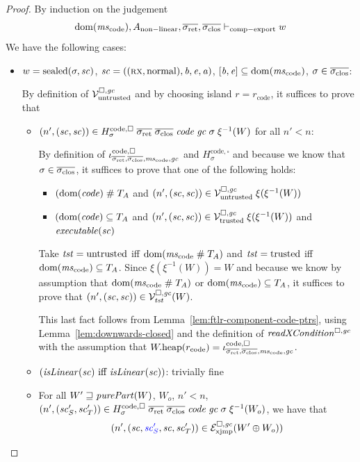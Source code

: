 \documentclass[a4paper]{article}
\begin{document}
\begin{proof}
  By induction on the judgement
  \begin{equation*}
    \dom(\mscode), A_{\mathrm{non-linear}}, \sigrets,\sigcloss \vdash_{\mathrm{comp-export}} w
  \end{equation*}
  We have the following cases:
  \begin{itemize}
  \item $w = \sealed{\sigma,\vsc}$, $\vsc = ((\rx,\normal),\baddr,\eaddr,\aaddr)$, $[\baddr,\eaddr]\subseteq \dom(\mscode)$, $\sigma \in \sigcloss$:

    By definition of $\lrv$ and by choosing island $r = r_{\mathrm{code}}$, it suffices to prove that
    \begin{itemize}
    \item $\npair[n']{(\vsc,\vsc)} \in H^\mathrm{code,\square}_\sigma \; \sigrets \; \sigcloss \; \code \; \gc \; \sigma \; \xi^{-1}(W)$ for all $n' < n$:

      By definition of $\codereg{\sigrets,\sigcloss,\mscode,\gc}$ and $H^\mathrm{code,\square}_\sigma$ and because we know that $\sigma\in\sigcloss$, it suffices to prove that one of the following holds: 
      \begin{itemize}
      \item $(\dom(\code) \mathrel{\#} \ta$ and $\npair[n']{(\vsc,\vsc)} \in \lrv \; \xi(\xi^{-1}(W))$
      \item $(\dom(\code) \subseteq \ta$ and $\npair[n']{(\vsc,\vsc)} \in \lrvtrusted \; \xi(\xi^{-1}(W))$ and $\exec{\vsc}$
      \end{itemize}
      Take $\trust = \untrusted$ iff $\dom(\mscode \mathrel{\#} \ta)$ and $\trust = \trusted$ iff $\dom(\mscode) \subseteq \ta$.
      Since $\xi(\xi^{-1}(W)) = W$ and because we know by assumption that $\dom(\mscode \mathrel{\#} \ta)$ or $\dom(\mscode) \subseteq \ta$, it suffices to prove that $\npair[n']{(\vsc,\vsc)} \in \lrvg{\trust}(W)$.

      This last fact follows from Lemma~\ref{lem:ftlr-component-code-ptrs}, using Lemma~\ref{lem:downwards-closed} and the definition of $\xReadCond{}$ with the assumption that $\pwheap(r_{\mathrm{code}}) = \codereg{\sigrets,\sigcloss,\mscode,\gc}$.

    \item $(\isLinear{\vsc} \text{ iff } \isLinear{\vsc})$: trivially fine

    \item
      For all $W' \future \purePart{W}$, $W_o$, $n' < n$, $\npair[n']{(\vsc_S',\vsc'_T)} \in H^\mathrm{code,\square}_\sigma \; \sigrets \; \sigcloss \; \code \; \gc \; \sigma \; \xi^{-1}(W_o)$, we have that
      \begin{equation*}
        \npair[n']{(\vsc,\src{\vsc_S'},\vsc,\vsc_T')} \in \lrexj(W'\oplus W_o))
      \end{equation*}


\end{itemize}
\end{itemize}
\end{proof}
\end{document}
